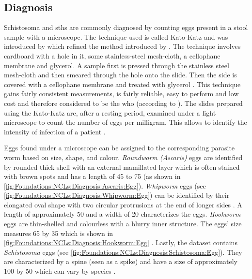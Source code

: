 \subsection{Diagnosis}
\label{sec:Foundations:NTDs:Diagnosis}

Schistosoma and \acp{sth} are commonly diagnosed by counting eggs present in a stool sample with a microscope. The technique used is called Kato-Katz \cite{nelwan2019schistosomiasis} and was introduced by \textcite{katz1972simple} which refined the method introduced by \citeauthor{kato1954comparative} \cite{kato1954comparative,kato1960correct}. The technique involves cardboard with a hole in it, some stainless-steel mesh-cloth, a cellophane membrane and glycerol. A sample first is pressed through the stainless steel mesh-cloth and then smeared through the hole onto the slide. Then the side is covered with a cellophane membrane and treated with glycerol \cite{mbongngwese2020diagnostic}. This technique gains fairly consistent measurements, is fairly reliable, easy to perform and low cost \cite{katz1972simple} and therefore considered to be the \ac{who}  (according to \textcite{mbongngwese2020diagnostic}).
The slides prepared using the Kato-Katz are, after a resting period, examined under a light microscope to count the number of eggs per milligram. This allows to identify the intensity of infection of a patient \cite{feasey2010neglected}. 

Eggs found under a microscope can be assigned to the corresponding parasite worm based on size, shape, and colour. \emph{Roundworm (Ascaris)} eggs are identified by rounded thick shell with an external mamillated layer which is often stained with brown spots and has a length of \unit{45}{\micro\meter} to \unit{75}{\micro\meter} \cite{dpdx2019ascariasis} (as shown in \autoref{fig:Foundations:NCLs:Diagnosis:Ascaris:Egg}).
\emph{Whipworm} eggs (see \autoref{fig:Foundations:NCLs:Diagnosis:Whipworm:Egg}) can be identified by their elongated oval shape with two circular protrusions at the end of longer sides \cite{dpdx2017trichuriasis,larsson2020development}. A length of approximately \unit{50}{\micro\meter} and a width of \unit{20}{\micro\meter} characterizes the eggs.
\emph{Hookworm} eggs are thin-shelled and colourless with a blurry inner structure. The eggs' size measures \unit{65}{\micro\meter} by \unit{35}{\micro\meter} which is shown in \autoref{fig:Foundations:NCLs:Diagnosis:Hookworm:Egg} \cite{dpdx2019hookworm, larsson2020development}.
Lastly, the dataset contains \emph{Schistosoma} eggs (see \autoref{fig:Foundations:NCLs:Diagnosis:Schistosoma:Egg}). They are characterized by a spine (seen as a spike) 
and have a size of approximately \unit{100}{\micro\meter} by \unit{50}{\micro\meter} which can vary by species \cite{dpdx2019schistosomiasis, larsson2020development}.

